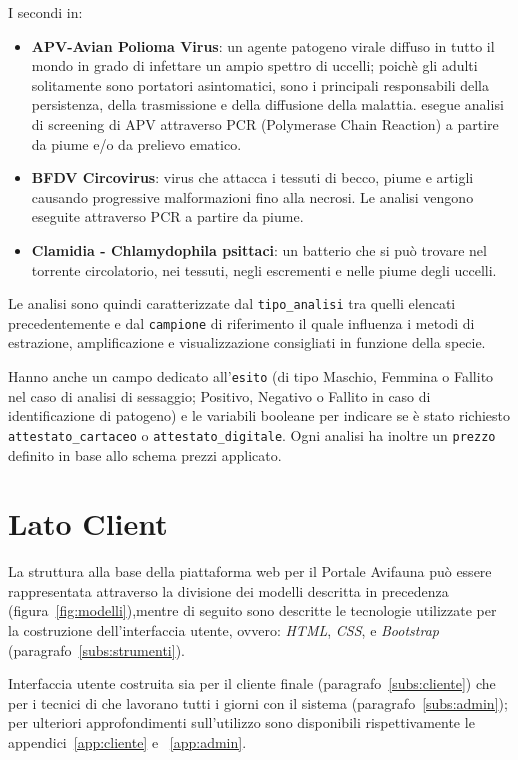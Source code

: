 I secondi in:
\begin{itemize}
 \item \textbf{APV-Avian Polioma Virus}: un agente patogeno virale diffuso in tutto il mondo in grado di infettare un ampio spettro di uccelli; poichè gli adulti solitamente sono portatori asintomatici, sono i principali responsabili della persistenza, della trasmissione e della diffusione della malattia. {\fem} esegue analisi di screening di APV attraverso PCR (Polymerase Chain Reaction) a partire da piume e/o da prelievo ematico.
 \item \textbf{BFDV Circovirus}: virus che attacca i tessuti di becco, piume e artigli causando progressive malformazioni fino alla necrosi. Le analisi vengono eseguite attraverso PCR a partire da piume.
 \item \textbf{Clamidia - Chlamydophila psittaci}: un batterio che si può trovare nel torrente circolatorio, nei tessuti, negli escrementi e nelle piume degli uccelli.
\end{itemize}

Le analisi sono quindi caratterizzate dal \texttt{tipo\_analisi} tra quelli elencati precedentemente e dal \texttt{campione} di riferimento il quale influenza i metodi di estrazione, amplificazione e visualizzazione consigliati in funzione della specie.

Hanno anche un campo dedicato all'\texttt{esito} (di tipo Maschio, Femmina o Fallito nel caso di analisi di sessaggio; Positivo, Negativo o Fallito in caso di identificazione di patogeno) e le variabili booleane per indicare se è stato richiesto \texttt{attestato\_cartaceo} o \texttt{attestato\_digitale}. Ogni analisi ha inoltre un \texttt{prezzo} definito in base allo schema prezzi applicato.

\newpage
\section{Lato Client}
\label{sec:client}
La struttura alla base della piattaforma web per il Portale Avifauna può essere rappresentata attraverso la divisione dei modelli descritta in precedenza (figura~\ref{fig:modelli}),mentre di seguito sono descritte le tecnologie utilizzate per la costruzione dell'interfaccia utente, ovvero: \emph{HTML}, \emph{CSS}, \emph{\js} e \emph{Bootstrap} (paragrafo~\ref{subs:strumenti}).

Interfaccia utente costruita sia per il cliente finale (paragrafo~\ref{subs:cliente}) che per i tecnici di {\fem} che lavorano tutti i giorni con il sistema (paragrafo~\ref{subs:admin}); per ulteriori approfondimenti sull'utilizzo sono disponibili rispettivamente le appendici~\ref{app:cliente} e ~\ref{app:admin}.

